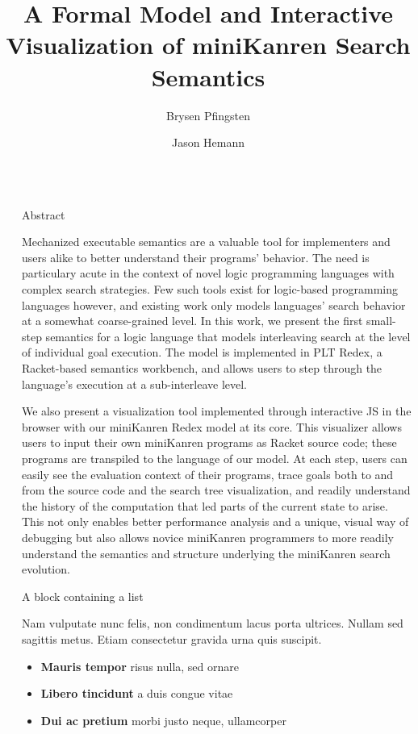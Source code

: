 \documentclass[final]{beamer}
\title{A Formal Model and Interactive Visualization of miniKanren Search Semantics}
\author{Brysen Pfingsten \and Jason Hemann}
\newlength{\sepwidth}
\newlength{\colwidth}
\newcommand{\separatorcolumn}{\begin{column}{\sepwidth}\end{column}}
\begin{document}


\begin{frame}[t]
\begin{columns}[t]
\separatorcolumn

\begin{column}{\colwidth}

  \begin{block}{Abstract}

Mechanized executable semantics are a valuable tool for implementers and users alike to better understand their programs' behavior. The need is particulary acute in the context of novel logic programming languages with complex search strategies. Few such tools exist for logic-based programming languages however, and existing work only models languages' search behavior at a somewhat coarse-grained level. In this work, we present the first small-step semantics for a logic language that models interleaving search at the level of individual goal execution. The model is implemented in PLT Redex, a Racket-based semantics workbench, and allows users to step through the language's execution at a sub-interleave level.

We also present a visualization tool implemented through interactive JS in the browser with our miniKanren Redex model at its core. This visualizer allows users to input their own miniKanren programs as Racket source code; these programs are transpiled to the language of our model. At each step, users can easily see the evaluation context of their programs, trace goals both to and from the source code and the search tree visualization, and readily understand the history of the computation that led parts of the current state to arise. This not only enables better performance analysis and a unique, visual way of debugging but also allows novice miniKanren programmers to more readily understand the semantics and structure underlying the miniKanren search evolution.

  \end{block}

  \begin{block}{A block containing a list}

    Nam vulputate nunc felis, non condimentum lacus porta ultrices. Nullam sed
    sagittis metus. Etiam consectetur gravida urna quis suscipit.

    \begin{itemize}
      \item \textbf{Mauris tempor} risus nulla, sed ornare
      \item \textbf{Libero tincidunt} a duis congue vitae
      \item \textbf{Dui ac pretium} morbi justo neque, ullamcorper
    \end{itemize}


\end{block}
\end{column}
\end{columns}
\end{frame}
\end{document}
